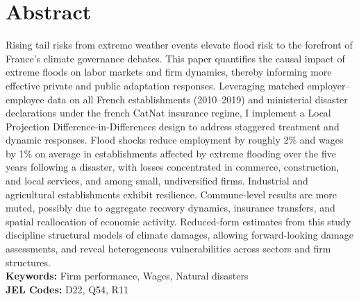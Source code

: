 \chapter*{\LARGE Abstract}
\label{ch: abstract}
\thispagestyle{plain}

Rising tail risks from extreme weather events elevate flood risk to the forefront of France’s climate governance debates. This paper quantifies the causal impact of extreme floods on labor markets and firm dynamics, thereby informing more effective private and public adaptation responses. Leveraging matched employer–employee data on all French establishments (2010–2019) and ministerial disaster declarations under the french CatNat insurance regime, I implement a Local Projection Difference-in-Differences design to address staggered treatment and dynamic responses. Flood shocks reduce employment by roughly 2\% and wages by 1\% on average in establishments affected by extreme flooding over the five years following a disaster, with losses concentrated in commerce, construction, and local services, and among small, undiversified firms. Industrial and agricultural establishments exhibit resilience. Commune-level results are more muted, possibly due to aggregate recovery dynamics, insurance transfers, and spatial reallocation of economic activity. Reduced-form estimates from this study discipline structural models of climate damages, allowing forward-looking damage assessments, and reveal heterogeneous vulnerabilities across sectors and firm structures.  \\

\noindent\textbf{Keywords:} Firm performance, Wages, Natural disasters \\
\noindent\textbf{JEL Codes:} D22, Q54, R11\\


